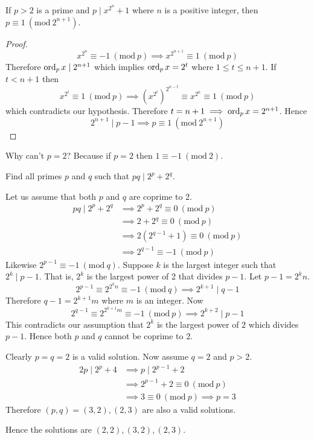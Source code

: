 \documentclass[11pt,numbers=noenddot,svgnames,dvipsnames]{scrartcl}
\renewcommand{\pmod}[1]{\ (\mathrm{mod}\ #1)}
\begin{document}
\begin{lemma}
    If $p > 2$ is a prime and $p \mid x^{2^{n}} + 1$ where 
    $n$ is a positive integer, then $p \equiv 1 \pmod{2^{n + 1}}$.
\end{lemma}
\begin{proof}
    \[
        x^{2^{n}} \equiv -1 \pmod p \implies x^{2^{n + 1}} \equiv 1 \pmod p
    \]
    Therefore $\operatorname{ord}_{p} x \mid 2^{n + 1}$ which implies $\operatorname{ord}_{p} x = 2^{t}$ where 
    $1 \leq t \leq n + 1$. If $t < n + 1$ then 
    \[
        x^{2^{t}} \equiv 1 \pmod p \implies \left(x^{2^{t}}\right)^{2^{n - t}} \equiv x^{2^{n}} \equiv 1 \pmod p
    \]
    which contradicts our hypothesis. Therefore $t = n+1 \implies \operatorname{ord}_{p} x = 2^{n + 1}$. Hence 
    \[
        2^{n+1}\mid p-1 \implies p \equiv 1 \pmod{2^{n+1}}
    \]
\end{proof}

\begin{remark}
    Why can't $p = 2$? Because if $p = 2$ then $ 1 \equiv -1 \pmod 2$.
\end{remark}

\begin{example}
    Find all primes $p$ and $q$ such that $pq \mid 2^{p} + 2^{q}$.
\end{example}
\begin{sol}
    Let us assume that both $p$ and $q$ are coprime to 2.
    \begin{align*}
        pq \mid 2^p + 2^q &\implies 2^p + 2^q \equiv 0 \pmod p \\
                          &\implies 2 + 2^q \equiv 0 \pmod p \\
                          &\implies 2(2^{q-1} + 1) \equiv 0 \pmod p \\
                          &\implies 2^{q-1} \equiv -1 \pmod p 
    \end{align*}
    Likewise $2^{p-1} \equiv -1 \pmod q$. Suppose $k$ is the largest integer 
    such that $2^{k} \mid p-1$. That is, $2^{k}$ is the largest power of 2 that divides $p - 1$. 
    Let $p-1 = 2^{k}n$. 
    \[
        2^{p-1} \equiv 2^{2^{k}n} \equiv -1 \pmod q \implies 2^{k+1} \mid q - 1
    \]
    Therefore $q-1 = 2^{k+1}m$ where $m$ is an integer. Now 
    \[
        2^{q-1} \equiv 2^{2^{k+1}m} \equiv -1 \pmod p \implies 2^{k+2}\mid p - 1
    \]
    This contradicts our assumption that $2^{k}$ is the largest power of $2$ which 
    divides $p-1$. Hence both $p$ and $q$ cannot be coprime to 2. 

    Clearly $p=q=2$ is a valid solution. Now assume $q=2$ and $p>2$. 
    \begin{align*}
        2p \mid 2^{p} + 4 &\implies p \mid 2^{p-1} + 2 \\
                          &\implies 2^{p-1} + 2 \equiv 0 \pmod p \\
                          &\implies 3 \equiv 0 \pmod p \implies p = 3
    \end{align*}
    Therefore $(p,q) = (3, 2), (2, 3)$ are also a valid solutions. 

    Hence the solutions are $(2,2), (3,2), (2,3)$.
\end{sol}
\end{document}
